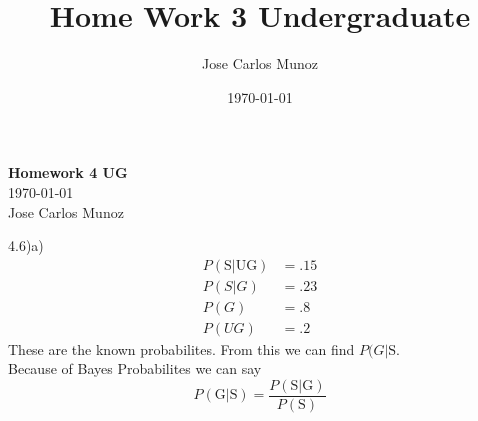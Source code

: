 \documentclass[12pt,english]{article}
\title{Home Work 3 Undergraduate}
\date{\today}
\author{Jose Carlos Munoz}
\begin{document}
\begin{center}
    \Large
    \textbf{Homework 4 UG}\\
    \small
    \today\\
    \large
    Jose Carlos Munoz
\end{center}%
4.6)a)\\
\begin{equation}\tag{1}\label{eq:1}
\begin{split}
P(\mbox{S}\vert \mbox{UG}) &= .15 \\
P(S\vert G) &= .23\\
P(G) &= .8\\
P(UG) &= .2
\end{split}
\end{equation}
These are the known probabilites. From this we can find $P(\mbox{}G\vert \mbox{S}$.\\
Because of Bayes Probabilites we can say
\begin{equation}
P(\mbox{G}\vert \mbox{S}) = \frac{P(\mbox{S} \vert \mbox{G})}{P(\mbox{S})}
\end{equation}
\end{document}
